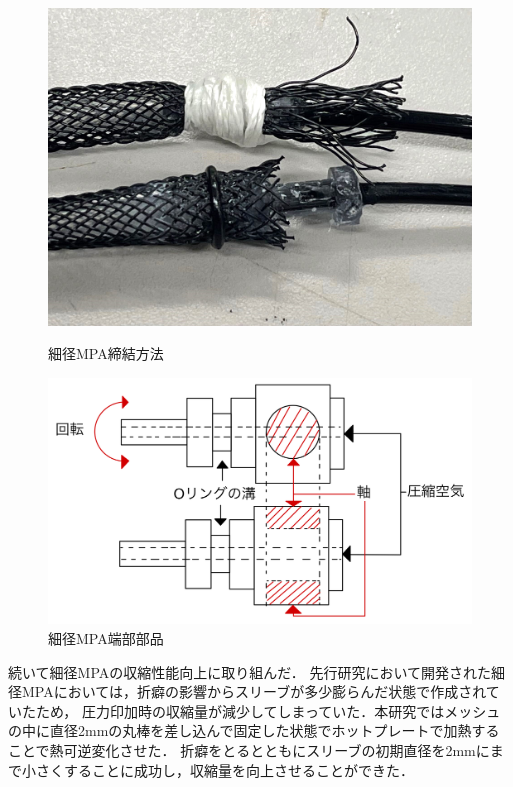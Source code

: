 \documentclass{jarticle}
\begin{document}
\begin{figure}[H]
  \begin{minipage}[b]{0.47\columnwidth}
    \centering
    \includegraphics[scale=0.05]{mpa_oring_1.jpg}
    \vspace{-2mm}
    \caption{細径MPA締結方法}
    \label{fig:OringMPA}
  \end{minipage}
  \hspace{0.04\columnwidth}
  \begin{minipage}[b]{0.47\columnwidth}
    \centering
    \includegraphics[scale=0.047]{MPA_irast.jpg}
    \vspace{-2mm}
    \caption{細径MPA端部部品}
    \label{fig:MPAparts}
  \end{minipage}
\end{figure}


続いて細径MPAの収縮性能向上に取り組んだ．
先行研究において開発された細径MPAにおいては，折癖の影響からスリーブが多少膨らんだ状態で作成されていたため，
圧力印加時の収縮量が減少してしまっていた．本研究ではメッシュの中に直径2mmの丸棒を差し込んで固定した状態でホットプレートで加熱することで熱可逆変化させた．
折癖をとるとともにスリーブの初期直径を2mmにまで小さくすることに成功し，収縮量を向上させることができた．
\end{document}
